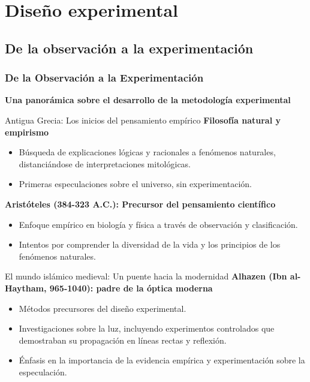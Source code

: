 ﻿\documentclass{beamer}
\begin{document}
\section{Diseño experimental}

\subsection{De la observación a la experimentación}

\begin{frame}
    \frametitle{De la Observación a la Experimentación}
    \centering
    \textbf{\Large Una panorámica sobre el desarrollo de la metodología experimental}
    \vspace{0.5cm}
\end{frame}

\begin{frame}{Antigua Grecia: Los inicios del pensamiento empírico}
    \textbf{Filosofía natural y empirismo}
    \begin{itemize}
        \item Búsqueda de explicaciones lógicas y racionales a fenómenos naturales, distanciándose de interpretaciones mitológicas.
        \item Primeras especulaciones sobre el universo, sin experimentación.
    \end{itemize}
  
    \textbf{Aristóteles (384-323 A.C.): Precursor del pensamiento científico}
    \begin{itemize}
        \item Enfoque empírico en biología y física a través de observación y clasificación.
        \item Intentos por comprender la diversidad de la vida y los principios de los fenómenos naturales.
    \end{itemize}
\end{frame}

\begin{frame}{El mundo islámico medieval: Un puente hacia la modernidad}
    \textbf{Alhazen (Ibn al-Haytham, 965-1040): padre de la óptica moderna}
    \begin{itemize}
        \item Métodos precursores del diseño experimental.
        \item Investigaciones sobre la luz, incluyendo experimentos controlados que demostraban su propagación en líneas rectas y reflexión.
        \item Énfasis en la importancia de la evidencia empírica y experimentación sobre la especulación.
    \end{itemize}
    \end{frame}
\end{document}
